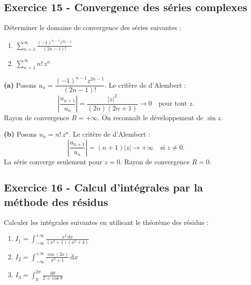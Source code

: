 \documentclass[12pt,a4paper]{article}
\begin{document}
\subsection*{Exercice 15 - Convergence des séries complexes \niveau{\moyen}}

\begin{boiteexercice}
Déterminer le domaine de convergence des séries suivantes :
\begin{enumerate}[label=(\alph*)]
  \item $\displaystyle\sum_{n=1}^\infty \frac{(-1)^{n-1}z^{2n-1}}{(2n-1)!}$
  \item $\displaystyle\sum_{n=1}^\infty n!\,z^n$
\end{enumerate}
\end{boiteexercice}

\begin{boitecorrige}
\textbf{(a)} Posons $u_n = \dfrac{(-1)^{n-1}z^{2n-1}}{(2n-1)!}$. Le critère de d'Alembert :
\[
\left|\frac{u_{n+1}}{u_n}\right| = \frac{|z|^2}{(2n)(2n+1)} \to 0 \quad\text{pour tout }z.
\]
Rayon de convergence $R = +\infty$. On reconnaît le développement de $\sin z$.

\textbf{(b)} Posons $u_n = n!\,z^n$. Le critère de d'Alembert :
\[
\left|\frac{u_{n+1}}{u_n}\right| = (n+1)|z| \to +\infty \quad\text{si }z\neq 0.
\]
La série converge seulement pour $z=0$. Rayon de convergence $R = 0$.
\end{boitecorrige}


\subsection*{Exercice 16 - Calcul d'intégrales par la méthode des résidus \niveau{\difficile}}

\begin{boiteexercice}
Calculer les intégrales suivantes en utilisant le théorème des résidus :
\begin{enumerate}[label=(\alph*)]
  \item $\displaystyle I_1 = \int_{-\infty}^{+\infty}\frac{x^2\,\mathrm{d}x}{(x^2+1)(x^2+4)}$
  \item $\displaystyle I_2 = \int_{-\infty}^{+\infty}\frac{\cos(2x)}{x^2+1}\,\mathrm{d}x$
  \item $\displaystyle I_3 = \int_0^{2\pi}\frac{\mathrm{d}\theta}{2+\cos\theta}$
\end{enumerate}
\end{boiteexercice}
\end{document}
